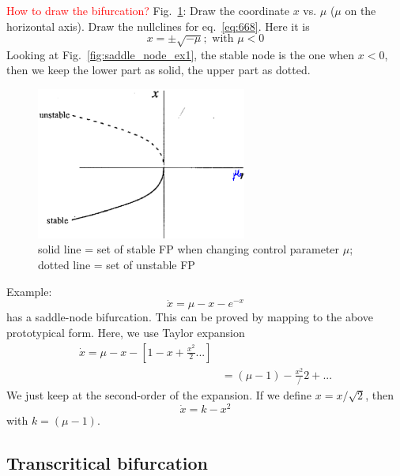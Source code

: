 \textcolor{red}{How to draw the bifurcation?}
  Fig.~\ref{fig:saddle_node_bifur}: Draw the coordinate $x$ vs. $\mu$
  ($\mu$ on the horizontal axis). Draw the nullclines for
  eq.~\eqref{eq:668}. Here it is
\begin{equation}
  \label{eq:681}
  x = \pm \sqrt{-\mu}; \text{ with } \mu < 0
\end{equation}
Looking at Fig.~\ref{fig:saddle_node_ex1}, the stable node is the one
when $x<0$, then we keep the lower part as solid, the upper part as
dotted.
\begin{figure}[hbt]
  \centerline{\includegraphics[height=5cm,
    angle=0]{./images/saddle_node_bifur.eps}}
  \caption{solid line = set of stable FP when changing control
    parameter $\mu$; dotted line = set of unstable FP}
  \label{fig:saddle_node_bifur}
\end{figure}

Example:
\begin{equation}
  \label{eq:103}
  \dot{x} = \mu - x - e^{-x}
\end{equation}
has a saddle-node bifurcation. This can be proved by mapping to the
above prototypical form. Here, we use Taylor expansion
\begin{equation}
  \label{eq:679}
  \begin{split}
    \dot{x} = \mu - x - \left[1 - x + \frac{x^2}{2} ...\right] \\
    &= (\mu - 1) - \frac{x^2}/2 + ...
  \end{split}
\end{equation}
We just keep at the second-order of the expansion. If we define
$x=x/\sqrt{2}$, then
\begin{equation}
  \label{eq:680}
  \dot{x} = k - x^2
\end{equation}
with $k=(\mu-1)$. 


\subsection{Transcritical bifurcation}
\label{sec:transcr-bifurc}

